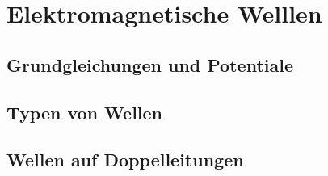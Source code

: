 \documentclass[12pt]{article} %
\numberwithin{equation}{subsection}
\begin{document}
	\section{Elektromagnetische Welllen}
	\subsection{Grundgleichungen und Potentiale}
	
	 
	
	\subsection{Typen von Wellen}
	
	 
	
	\subsection{Wellen auf Doppelleitungen}
	
	 
	
\end{document}
